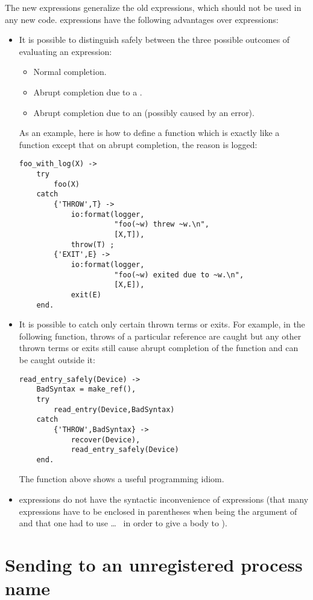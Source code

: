 The new  expressions generalize the old  expressions,
which should not be used in any new code.   expressions have
the following advantages over  expressions:
\begin{itemize}
\item It is possible to distinguish safely between the three possible
outcomes of evaluating an expression:
\begin{itemize}
\item Normal completion.
\item Abrupt completion due to a .
\item Abrupt completion due to an  (possibly caused by an error).
\end{itemize}
As an example, here is how to define a function  which
is exactly like a function  except that on abrupt completion,
the reason is logged:
\begin{verbatim}
foo_with_log(X) ->
    try
        foo(X)
    catch
        {'THROW',T} ->
            io:format(logger,
                      "foo(~w) threw ~w.\n",
                      [X,T]),
            throw(T) ;
        {'EXIT',E} ->
            io:format(logger,
                      "foo(~w) exited due to ~w.\n",
                      [X,E]),
            exit(E)
    end.
\end{verbatim}
\item It is possible to catch only certain thrown terms or exits.  For example,
in the following function, throws of a particular reference  are
caught but any other thrown terms or exits still cause abrupt completion of the
function and can be caught outside it:
\begin{verbatim}
read_entry_safely(Device) ->
    BadSyntax = make_ref(),
    try
        read_entry(Device,BadSyntax)
    catch
        {'THROW',BadSyntax} ->
            recover(Device),
            read_entry_safely(Device)
    end.
\end{verbatim}
The function above shows a useful programming idiom.
\item {} expressions do not have the syntactic inconvenience of 
expressions (that many expressions have to be enclosed in parentheses when
being the argument of  and that one had to use  \ldots\ 
in order to give a body to ).
\end{itemize}

\section{Sending to an unregistered process name}

